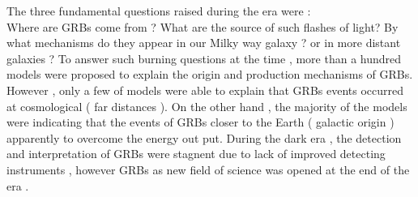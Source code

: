 The three fundamental questions raised during  the  era  were : \\  Where are GRBs come from ?   What are the source of such flashes of light?  By  what mechanisms  do they appear in our Milky way galaxy ? or in more distant galaxies ? To answer such burning questions  at the time , more  than a  hundred  models  were  proposed to explain the origin  and  production  mechanisms of GRBs. However ,  only a few  of models   were  able  to  explain  that GRBs events  occurred  at  cosmological ( far distances ). On the other  hand ,  the  majority  of  the  models  were  indicating  that the  events  of GRBs closer to the Earth ( galactic  origin )  apparently to  overcome  the energy  out put. During  the dark era , the  detection  and  interpretation  of  GRBs  were  stagnent due to lack  of  improved  detecting  instruments , however  GRBs as new field  of  science  was  opened  at  the  end   of  the  era .\citep{ 4  ,  6 } \\\\
